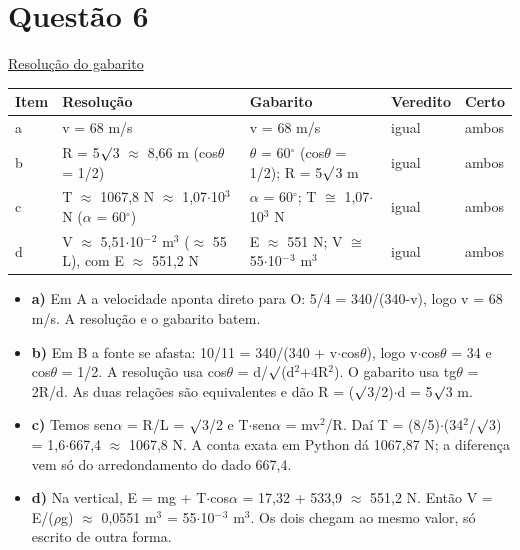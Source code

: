 \documentclass{article}%
\begin{document}
\section*{Questão 6}%
\href{https://poliedroresolve.sistemapoliedro.com.br/vestibulares/ime/2027/ime-2-fase-dia-2-27-10-2026-2-fase-dia-2/dissertativa-6-fisica-2-fase-dia-2-ime-2027}{Resolução do gabarito}\par\smallskip%
\begin{longtable}{@{}p{} p{} p{} p{} p{}@{}}\toprule Item & Resolução & Gabarito & Veredito & Certo \\ \midrule
a & v = 68 m/s & v = 68 m/s & igual & ambos \\
b & R = 5$\surd$3 $\approx$ 8,66 m (cos$\theta$ = 1/2) & $\theta$ = 60$^\circ$ (cos$\theta$ = 1/2); R = 5$\surd$3 m & igual & ambos \\
c & T $\approx$ 1067,8 N $\approx$ 1,07$\cdot$10$^3$ N ($\alpha$ = 60$^\circ$) & $\alpha$ = 60$^\circ$; T $\cong$ 1,07$\cdot$10$^3$ N & igual & ambos \\
d & V $\approx$ 5,51$\cdot$10$^{-}$$^2$ m$^3$ ($\approx$ 55 L), com E $\approx$ 551,2 N & E $\approx$ 551 N; V $\cong$ 55$\cdot$10$^{-}$$^3$ m$^3$ & igual & ambos \\
\bottomrule\end{longtable}%
\begin{itemize}%
\item%
\textbf{a)} Em A a velocidade aponta direto para O: 5/4 = 340/(340-v), logo v = 68 m/s. A resolução e o gabarito batem.%
\item%
\textbf{b)} Em B a fonte se afasta: 10/11 = 340/(340 + v$\cdot$cos$\theta$), logo v$\cdot$cos$\theta$ = 34 e cos$\theta$ = 1/2. A resolução usa cos$\theta$ = d/$\surd$(d$^2$+4R$^2$). O gabarito usa tg$\theta$ = 2R/d. As duas relações são equivalentes e dão R = ($\surd$3/2)$\cdot$d = 5$\surd$3 m.%
\item%
\textbf{c)} Temos sen$\alpha$ = R/L = $\surd$3/2 e T$\cdot$sen$\alpha$ = mv$^2$/R. Daí T = (8/5)$\cdot$(34$^2$/$\surd$3) = 1,6$\cdot$667,4 $\approx$ 1067,8 N. A conta exata em Python dá 1067,87 N; a diferença vem só do arredondamento do dado 667,4.%
\item%
\textbf{d)} Na vertical, E = mg + T$\cdot$cos$\alpha$ = 17,32 + 533,9 $\approx$ 551,2 N. Então V = E/($\rho$g) $\approx$ 0,0551 m$^3$ = 55$\cdot$10$^{-}$$^3$ m$^3$. Os dois chegam ao mesmo valor, só escrito de outra forma.%
\end{itemize}%
\end{document}
